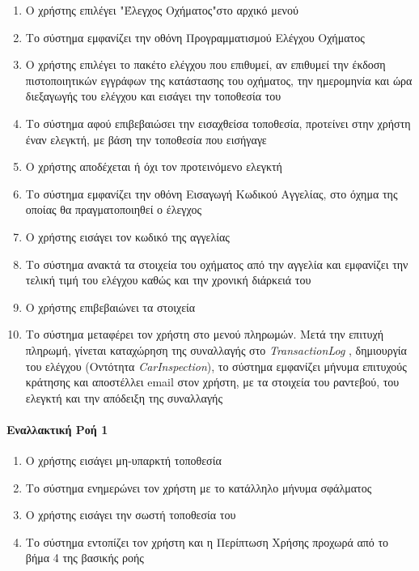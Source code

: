 \documentclass{../ol-softwaremanual}
\begin{document}
	\begin{enumerate}
		\item Ο χρήστης επιλέγει \en"\gr Έλεγχος Οχήματος\en"\gr στο αρχικό μενού
		\item Το σύστημα εμφανίζει την οθόνη Προγραμματισμού Ελέγχου Οχήματος
		\item Ο χρήστης επιλέγει το πακέτο ελέγχου που επιθυμεί, αν επιθυμεί την έκδοση πιστοποιητικών εγγράφων της κατάστασης του οχήματος, την ημερομηνία και ώρα διεξαγωγής του ελέγχου και εισάγει την τοποθεσία του
		\item Το σύστημα αφού επιβεβαιώσει την εισαχθείσα τοποθεσία, προτείνει στην χρήστη έναν ελεγκτή, με βάση την τοποθεσία που εισήγαγε
		\item Ο χρήστης αποδέχεται ή όχι τον προτεινόμενο ελεγκτή
		\item Το σύστημα εμφανίζει την οθόνη Εισαγωγή Κωδικού Αγγελίας, στο όχημα της οποίας θα πραγματοποιηθεί ο έλεγχος		
		\item Ο χρήστης εισάγει τον κωδικό της αγγελίας
		\item Το σύστημα ανακτά τα στοιχεία του οχήματος από την αγγελία και εμφανίζει την τελική τιμή του ελέγχου καθώς και την χρονική διάρκειά του
		\item Ο χρήστης επιβεβαιώνει τα στοιχεία
		\item Το σύστημα μεταφέρει τον χρήστη στο μενού πληρωμών. Μετά την επιτυχή πληρωμή, γίνεται καταχώρηση της συναλλαγής στο \en \textit{TransactionLog} \gr, δημιουργία του ελέγχου (Οντότητα \en \textit{CarInspection}\gr), το σύστημα εμφανίζει μήνυμα επιτυχούς κράτησης και αποστέλλει \en email \gr στον χρήστη, με τα στοιχεία του ραντεβού, του ελεγκτή και την απόδειξη της συναλλαγής
	\end{enumerate}
	
	\paragraph{Εναλλακτική Ροή 1}
	
	\begin{enumerate}
		\item Ο χρήστης εισάγει μη-υπαρκτή τοποθεσία
		\item Το σύστημα ενημερώνει τον χρήστη με το κατάλληλο μήνυμα σφάλματος 
		\item Ο χρήστης εισάγει την σωστή τοποθεσία του
		\item Το σύστημα εντοπίζει τον χρήστη και η Περίπτωση Χρήσης προχωρά από το βήμα 4 της βασικής ροής
	\end{enumerate}
\end{document}

